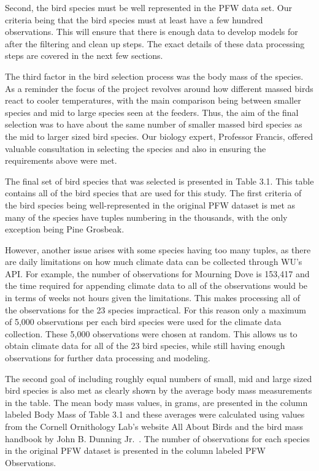 Second, the bird species must be well represented in the PFW data set. Our criteria being that the bird species must at least have a few hundred observations. This will ensure that there is enough data to develop models for after the filtering and clean up steps. The exact details of these data processing steps are covered in the next few sections. 

The third factor in the bird selection process was the body mass of the species. As a reminder the focus of the project revolves around how different massed birds react to cooler temperatures, with the main comparison being between smaller species and mid to large species seen at the feeders. Thus, the aim of the final selection was to have about the same number of smaller massed bird species as the mid to larger sized bird species. Our biology expert, Professor Francis, offered valuable consultation in selecting the species and also in ensuring the requirements above were met.

The final set of bird species that was selected is presented in Table 3.1. This table contains all of the bird species that are used for this study. The first criteria of the bird species being well-represented in the original PFW dataset is met as many of the species have tuples numbering in the thousands, with the only exception being Pine Grosbeak. 

However, another issue arises with some species having too many tuples, as there are daily limitations on how much climate data can be collected through WU's API. For example, the number of observations for Mourning Dove is 153,417 and the time required for appending climate data to all of the observations would be in terms of weeks not hours given the limitations. This makes processing all of the observations for the 23 species impractical. For this reason only a maximum of 5,000 observations per each bird species were used for the climate data collection. These 5,000 observations were chosen at random. This allows us to obtain climate data for all of the 23 bird species, while still having enough observations for further data processing and modeling.   

The second goal of including roughly equal numbers of small, mid and large sized bird species is also met as clearly shown by the average body mass measurements in the table. The mean body mass values, in grams, are presented in the column labeled Body Mass of Table 3.1 and these averages were calculated using values from the Cornell Ornithology Lab's website All About Birds and the bird mass handbook by John B. Dunning Jr.~\cite{AllAboutBirds:online, dunning2007crc}. The number of observations for each species in the original PFW dataset is presented in the column labeled PFW Observations. 

